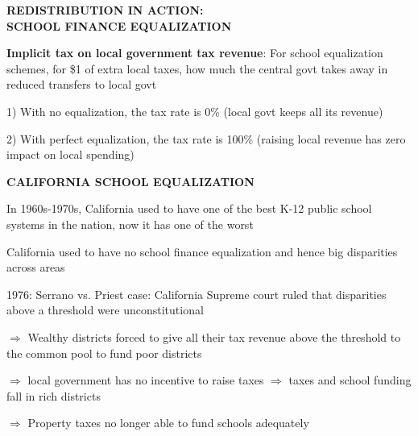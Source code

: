 \documentclass[landscape]{slides}
\begin{document}
\begin{slide}
\begin{center}
{\bf REDISTRIBUTION IN ACTION: \\ SCHOOL FINANCE EQUALIZATION}
\end{center}

{\bf Implicit tax on local government tax revenue}:
For school equalization schemes, for \$1 of extra local taxes, how much the central govt takes
away in reduced transfers to local govt

1) With no equalization, the tax rate is 0\% (local govt keeps all its revenue)

2) With perfect equalization, the tax rate is 100\% (raising local revenue has zero impact on local spending)

\end{slide}



\begin{slide}
\begin{center}
{\bf CALIFORNIA SCHOOL EQUALIZATION}
\end{center}

In 1960s-1970s, California used to have one of the best K-12 public school systems in the nation,
now it has one of the worst

California used to have no school finance equalization and hence big disparities across areas

1976: Serrano vs. Priest case: California Supreme court ruled that disparities above a threshold were unconstitutional

$\Rightarrow$ Wealthy districts forced to give all their tax revenue above the threshold to the common pool
to fund poor districts

$\Rightarrow$ local government has
no incentive to raise taxes $\Rightarrow$ taxes and school funding fall in rich districts

$\Rightarrow$ Property taxes no longer able to fund schools adequately
\end{slide}
\end{document}
